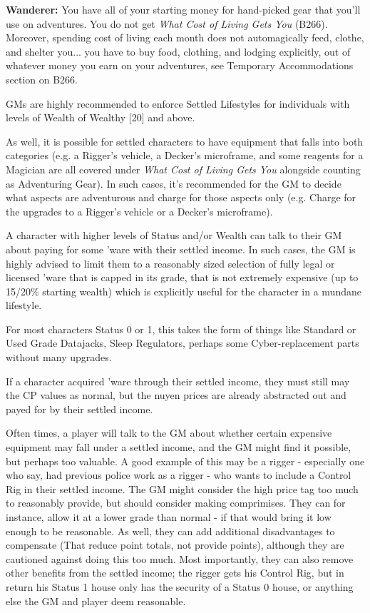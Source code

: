 \begin{multicols*}{2}
	\textbf{Wanderer:} You have all of your starting money for hand-picked gear that you'll use on adventures. You do not get \textit{What Cost of Living Gets You} (B266). Moreover, spending cost of living each month does not automagically feed, clothe, and shelter you... you have to buy food, clothing, and lodging explicitly, out of whatever money you earn on your adventures, see Temporary Accommodations section on B266.
	
	GMs are highly recommended to enforce Settled Lifestyles for individuals with levels of Wealth of Wealthy [20] and above. 
	
	As well, it is possible for settled characters to have equipment that falls into both categories (e.g. a Rigger's vehicle, a Decker's microframe, and some reagents for a Magician are all covered under \textit{What Cost of Living Gets You} alongside counting as Adventuring Gear). In such cases, it's recommended for the GM to decide what aspects are adventurous and charge for those aspects only (e.g. Charge for the upgrades to a Rigger's vehicle or a Decker's microframe).
	
	A character with higher levels of Status and/or Wealth can talk to their GM about paying for some 'ware with their settled income. In such cases, the GM is highly advised to limit them to a reasonably sized selection of fully legal or licensed 'ware that is capped in its grade, that is not extremely expensive (up to 15/20\% starting wealth) which is explicitly useful for the character in a mundane lifestyle. 
	
	For most characters Status 0 or 1, this takes the form of things like Standard or Used Grade Datajacks, Sleep Regulators, perhaps some Cyber-replacement parts without many upgrades.
	
	If a character acquired 'ware through their settled income, they must still may the CP values as normal, but the nuyen prices are already abstracted out and payed for by their settled income.
	
	Often times, a player will talk to the GM about whether certain expensive equipment may fall under a settled income, and the GM might find it possible, but perhaps too valuable. A good example of this may be a rigger - especially one who say, had previous police work as a rigger - who wants to include a Control Rig in their settled income. The GM might consider the high price tag too much to reasonably provide, but should consider making comprimises. They can for instance, allow it at a lower grade than normal - if that would bring it low enough to be reasonable. As well, they can add additional disadvantages to compensate (That reduce point totals, not provide points), although they are cautioned against doing this too much. Most importantly, they can also remove other benefits from the settled income; the rigger gets his Control Rig, but in return his Status 1 house only has the security of a Status 0 house, or anything else the GM and player deem reasonable.
	

\end{multicols*}
